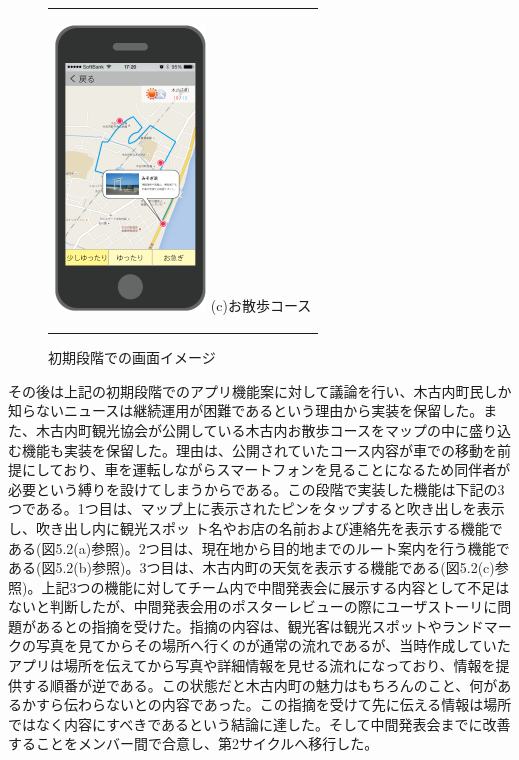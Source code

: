 \begin{figure}[htbp]
\begin{center}
\begin{tabular}{c}
      \begin{minipage}{0.33\hsize}
        \begin{center}
\includegraphics[width=4cm, bb=0 0 302 572]{5.2_sanpo.png}
          \hspace{1cm} (c)お散歩コース
        \end{center}
      \end{minipage}

    \end{tabular}
    \caption{初期段階での画面イメージ}
    \label{fig:lena}
  \end{center}
\end{figure}

その後は上記の初期段階でのアプリ機能案に対して議論を行い、木古内町民しか知らないニュースは継続運用が困難であるという理由から実装を保留した。また、木古内町観光協会が公開している木古内お散歩コースをマップの中に盛り込む機能も実装を保留した。理由は、公開されていたコース内容が車での移動を前提にしており、車を運転しながらスマートフォンを見ることになるため同伴者が必要という縛りを設けてしまうからである。この段階で実装した機能は下記の3つである。1つ目は、マップ上に表示されたピンをタップすると吹き出しを表示し、吹き出し内に観光スポッ ト名やお店の名前および連絡先を表示する機能である(図5.2(a)参照)。2つ目は、現在地から目的地までのルート案内を行う機能である(図5.2(b)参照)。3つ目は、木古内町の天気を表示する機能である(図5.2(c)参照)。上記3つの機能に対してチーム内で中間発表会に展示する内容として不足はないと判断したが、中間発表会用のポスターレビューの際にユーザストーリに問題があるとの指摘を受けた。指摘の内容は、観光客は観光スポットやランドマークの写真を見てからその場所へ行くのが通常の流れであるが、当時作成していたアプリは場所を伝えてから写真や詳細情報を見せる流れになっており、情報を提供する順番が逆である。この状態だと木古内町の魅力はもちろんのこと、何があるかすら伝わらないとの内容であった。この指摘を受けて先に伝える情報は場所ではなく内容にすべきであるという結論に達した。そして中間発表会までに改善することをメンバー間で合意し、第2サイクルへ移行した。

